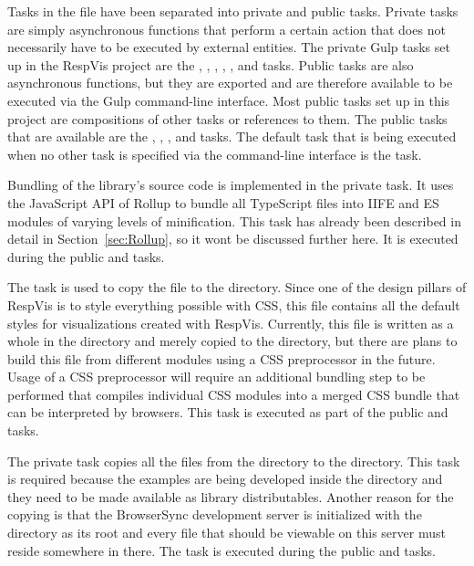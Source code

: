 Tasks in the  file have been separated into private and public tasks.
Private tasks are simply asynchronous functions that perform a certain action that does not necessarily have to be executed by external entities.
The private Gulp tasks set up in the RespVis project are the , , , , , and  tasks.  
Public tasks are also asynchronous functions, but they are exported and are therefore available to be executed via the Gulp command-line interface.
Most public tasks set up in this project are compositions of other tasks or references to them.
The public tasks that are available are the , , , and  tasks.
The default task that is being executed when no other task is specified via the command-line interface is the  task.

Bundling of the library's source code is implemented in the private  task. 
It uses the JavaScript API of Rollup to bundle all TypeScript files into IIFE and ES modules of varying levels of minification. 
This task has already been described in detail in Section~\ref{sec:Rollup}, so it wont be discussed further here.
It is executed during the public  and  tasks.

The  task is used to copy the  file to the  directory.
Since one of the design pillars of RespVis is to style everything possible with CSS, this file contains all the default styles for visualizations created with RespVis.
Currently, this file is written as a whole in the  directory and merely copied to the  directory, but there are plans to build this file from different modules using a CSS preprocessor in the future.
Usage of a CSS preprocessor will require an additional bundling step to be performed that compiles individual CSS modules into a merged CSS bundle that can be interpreted by browsers.
This task is executed as part of the public  and  tasks.

The private  task copies all the files from the  directory to the  directory.
This task is required because the examples are being developed inside the  directory and they need to be made available as library distributables.
Another reason for the copying is that the BrowserSync development server is initialized with the  directory as its root and every file that should be viewable on this server must reside somewhere in there.
The  task is executed during the public  and  tasks.

